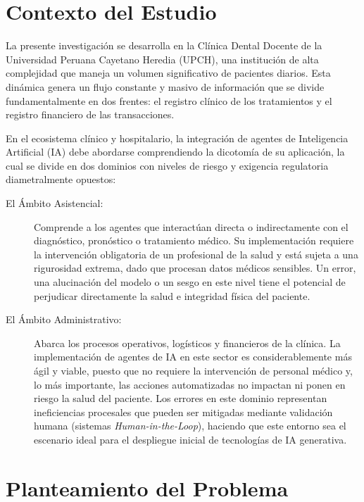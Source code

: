 \label{ch:introduccion}

\section{Contexto del Estudio}

La presente investigación se desarrolla en la Clínica Dental Docente de la Universidad Peruana Cayetano Heredia (UPCH), una institución de alta complejidad que maneja un volumen significativo de pacientes diarios. Esta dinámica genera un flujo constante y masivo de información que se divide fundamentalmente en dos frentes: el registro clínico de los tratamientos y el registro financiero de las transacciones.

En el ecosistema clínico y hospitalario, la integración de agentes de Inteligencia Artificial (IA) debe abordarse comprendiendo la dicotomía de su aplicación, la cual se divide en dos dominios con niveles de riesgo y exigencia regulatoria diametralmente opuestos:

\begin{description}
    \item[El Ámbito Asistencial:] Comprende a los agentes que interactúan directa o indirectamente con el diagnóstico, pronóstico o tratamiento médico. Su implementación requiere la intervención obligatoria de un profesional de la salud y está sujeta a una rigurosidad extrema, dado que procesan datos médicos sensibles. Un error, una alucinación del modelo o un sesgo en este nivel tiene el potencial de perjudicar directamente la salud e integridad física del paciente.
    \item[El Ámbito Administrativo:] Abarca los procesos operativos, logísticos y financieros de la clínica. La implementación de agentes de IA en este sector es considerablemente más ágil y viable, puesto que no requiere la intervención de personal médico y, lo más importante, las acciones automatizadas no impactan ni ponen en riesgo la salud del paciente. Los errores en este dominio representan ineficiencias procesales que pueden ser mitigadas mediante validación humana (sistemas \textit{Human-in-the-Loop}), haciendo que este entorno sea el escenario ideal para el despliegue inicial de tecnologías de IA generativa.
\end{description}

\section{Planteamiento del Problema}

